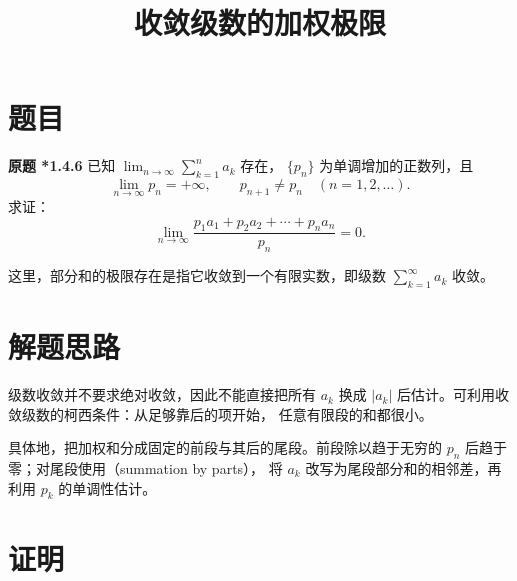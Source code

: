\documentclass{ctexart}
\title{收敛级数的加权极限}
\author{}
\date{}
\begin{document}
\maketitle

\section{题目}

\textbf{原题 *1.4.6}\quad
已知 $\displaystyle\lim_{n\to\infty}\sum_{k=1}^{n}a_k$ 存在，
$\{p_n\}$ 为单调增加的正数列，且
\[
  \lim_{n\to\infty}p_n=+\infty,
  \qquad p_{n+1}\ne p_n\quad(n=1,2,\ldots).
\]
求证：
\begin{equation}\label{eq:weighted-limit}
  \lim_{n\to\infty}
  \frac{p_1a_1+p_2a_2+\cdots+p_na_n}{p_n}=0.
\end{equation}

这里，部分和的极限存在是指它收敛到一个有限实数，即级数
$\sum_{k=1}^{\infty}a_k$ 收敛。

\section{解题思路}

级数收敛并不要求绝对收敛，因此不能直接把所有 $a_k$ 换成
$|a_k|$ 后估计。可利用收敛级数的柯西条件：从足够靠后的项开始，
任意有限段的和都很小。

具体地，把加权和分成固定的前段与其后的尾段。前段除以趋于无穷的
$p_n$ 后趋于零；对尾段使用（summation by parts），
将 $a_k$ 改写为尾段部分和的相邻差，再利用 $p_k$ 的单调性估计。

\section{证明}
\end{document}
